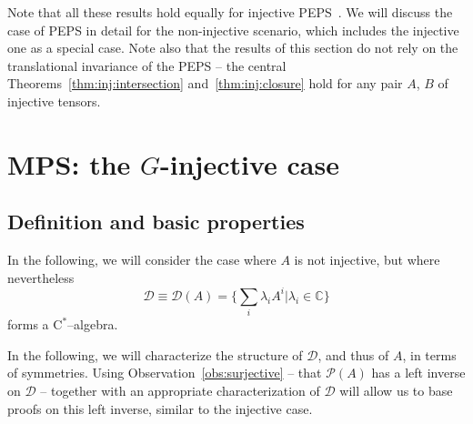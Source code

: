\documentclass{article}
\newcommand{\cstar}{$\mathrm{C}^*$}
\theoremstyle{plain}
\theoremstyle{definition}
\numberwithin{equation}{section}  %
\begin{document}
Note that all these results hold equally for injective
PEPS~\cite{perez-garcia:parent-ham-2d}. We will
discuss the case of PEPS in detail for the non-injective scenario, which
includes the injective one as a special case.  Note also that the results
of this section do not rely on the translational invariance of the PEPS --
the central Theorems~\ref{thm:inj:intersection} and~\ref{thm:inj:closure}
hold for any pair $A$, $B$ of injective tensors.



\section{MPS: the $G$-injective case \label{sec:mps-noninj} }

\subsection{Definition and basic properties}

In the following, we will consider the case where $A$ is not injective,
but where nevertheless
\begin{equation}
    \label{eq:noninj:alg-A}
    \mathcal D \equiv \mathcal D(A) =
    \Big\{\sum_{i} \lambda_i A^i \Big| \lambda_i\in\mathbb C \Big\}
\end{equation}
forms a \cstar--algebra.

In the following, we will characterize the structure of $\mathcal D$,
and thus of $A$, in terms of symmetries.
Using Observation~\ref{obs:surjective} -- that $\mathcal P(A)$ has a left
inverse on $\mathcal D$ -- together with an appropriate characterization
of $\mathcal D$ will allow us to base proofs on this left inverse, similar
to the injective case.
\end{document}
